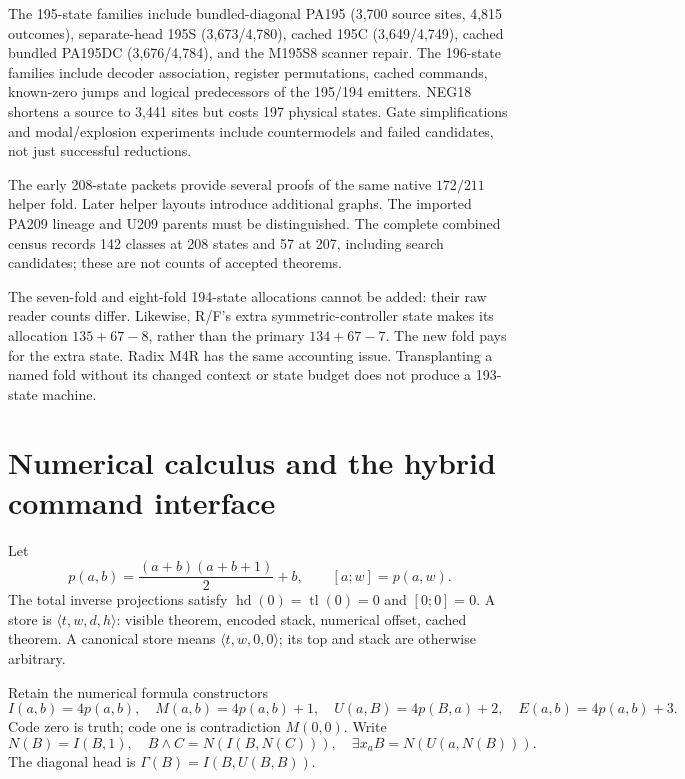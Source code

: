 \documentclass[11pt]{article}
\newcommand{\hd}{\operatorname{hd}}
\newcommand{\tl}{\operatorname{tl}}
\newcommand{\st}[4]{\langle #1,#2,#3,#4\rangle}
\begin{document}
The 195-state families include bundled-diagonal PA195 (3,700 source sites,
4,815 outcomes), separate-head 195S (3,673/4,780), cached 195C
(3,649/4,749), cached bundled PA195DC (3,676/4,784), and the M195S8 scanner
repair. The 196-state families include decoder association, register
permutations, cached commands, known-zero jumps and logical predecessors
of the 195/194 emitters. NEG18 shortens a source to 3,441 sites but costs
197 physical states. Gate simplifications and modal/explosion experiments
include countermodels and failed candidates, not just successful reductions.

The early 208-state packets provide several proofs of the same native
$172/211$ helper fold. Later helper layouts introduce additional graphs.
The imported PA209 lineage and U209 parents must be distinguished. The
complete combined census records 142 classes at 208 states and 57 at 207,
including search candidates; these are not counts of accepted theorems.

The seven-fold and eight-fold 194-state allocations cannot be added: their
raw reader counts differ. Likewise, R/F's extra symmetric-controller state
makes its allocation $135+67-8$, rather than the primary $134+67-7$.
The new fold pays for the extra state. Radix M4R has the same accounting
issue. Transplanting a named fold without its changed context or state
budget does not produce a 193-state machine.

\section{Numerical calculus and the hybrid command interface}

Let
\[
p(a,b)=\frac{(a+b)(a+b+1)}2+b,\qquad [a;w]=p(a,w).
\]
The total inverse projections satisfy $\hd(0)=\tl(0)=0$ and $[0;0]=0$.
A store is $\st{t}{w}{d}{h}$: visible theorem, encoded stack, numerical offset, cached theorem. A canonical store means $\st{t}{w}{0}{0}$; its top and stack are otherwise arbitrary.

Retain the numerical formula constructors
\[
 I(a,b)=4p(a,b),\quad M(a,b)=4p(a,b)+1,\quad
 U(a,B)=4p(B,a)+2,\quad E(a,b)=4p(a,b)+3.
\]
Code zero is truth; code one is contradiction $M(0,0)$. Write
\[
N(B)=I(B,1),\quad B\wedge C=N(I(B,N(C))),\quad
\exists x_a B=N(U(a,N(B))).
\]
The diagonal head is $\Gamma(B)=I(B,U(B,B))$.
\end{document}
